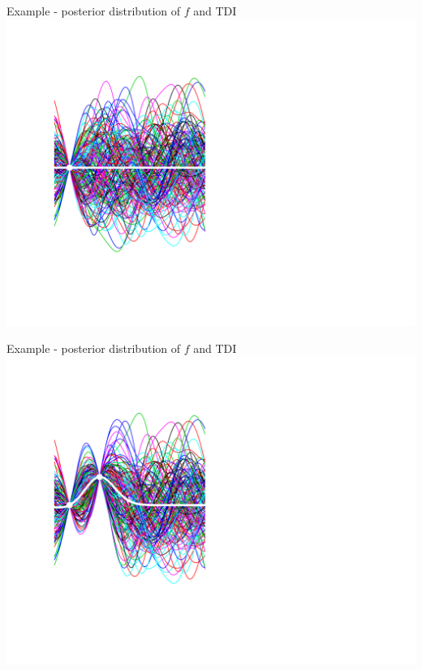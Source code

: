\documentclass[ignorenonframetext,xcolor=pdflatex,table,dvipsnames,serif]{beamer}
\begin{document}
\begin{frame}{Example - posterior distribution of $f$ and TDI}
  \center\includegraphics[scale=0.5]{probAni01}
\end{frame}
\begin{frame}{Example - posterior distribution of $f$ and TDI}
  \center\includegraphics[scale=0.5]{probAni02}
\end{frame}
\end{document}
